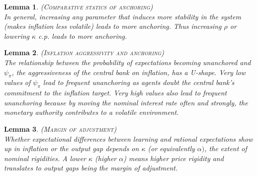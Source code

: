 \documentclass[11pt]{article}
\renewcommand{\[}{\begin{equation}}
\renewcommand{\]}{\end{equation}}
\newtheorem{lemma}{Lemma}
\begin{document}
	\begin{lemma}\textsc{(Comparative statics of anchoring)} \\
	In general, increasing any parameter that induces more stability in the system (makes inflation less volatile) leads to more anchoring. Thus increasing $\rho$ or lowering $\kappa$ c.p. leads to more anchoring.
	\end{lemma}
	
	\begin{lemma}\textsc{(Inflation aggressivity and anchoring)} \\
	The relationship between the probability of expectations becoming unanchored and $\psi_{\pi}$, the aggressiveness of the central bank on inflation, has a U-shape. Very low values of $\psi_{\pi}$ lead to frequent unanchoring as agents doubt the central bank's commitment to the inflation target. Very high values also lead to frequent unanchoring because by moving the nominal interest rate often and strongly, the monetary authority contributes to a volatile environment. 
	\end{lemma}
	\begin{figure}[h!]
	\centering
\end{figure}
	\begin{lemma} \textsc{(Margin of adjustment)} \\
	Whether expectational differences between learning and rational expectations show up in inflation or the output gap depends on $\kappa$ (or equivalently $\alpha)$, the extent of nominal rigidities. A lower $\kappa$ (higher $\alpha$) means higher price rigidity and translates to output gaps being the margin of adjustment. 
	\end{lemma}
	
\end{document}
